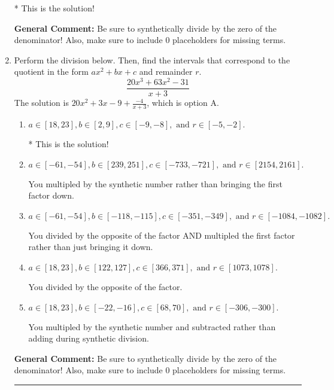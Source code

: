 \documentclass{extbook}[14pt]
\newcommand{\litem}[1]{\item #1

\rule{\textwidth}{0.4pt}}
\begin{document}
\begin{enumerate}
{\begin{enumerate}[label=\Alph*.]
* This is the solution!
\end{enumerate}

\textbf{General Comment:} Be sure to synthetically divide by the zero of the denominator! Also, make sure to include 0 placeholders for missing terms.
}
\litem{
Perform the division below. Then, find the intervals that correspond to the quotient in the form $ax^2+bx+c$ and remainder $r$.
\[ \frac{20x^{3} +63 x^{2} -31}{x + 3} \]The solution is \( 20x^{2} +3 x -9 + \frac{-4}{x + 3} \), which is option A.\begin{enumerate}[label=\Alph*.]
\item \( a \in [18, 23], b \in [2, 9], c \in [-9, -8], \text{ and } r \in [-5, -2]. \)

* This is the solution!
\item \( a \in [-61, -54], b \in [239, 251], c \in [-733, -721], \text{ and } r \in [2154, 2161]. \)

 You multipled by the synthetic number rather than bringing the first factor down.
\item \( a \in [-61, -54], b \in [-118, -115], c \in [-351, -349], \text{ and } r \in [-1084, -1082]. \)

 You divided by the opposite of the factor AND multipled the first factor rather than just bringing it down.
\item \( a \in [18, 23], b \in [122, 127], c \in [366, 371], \text{ and } r \in [1073, 1078]. \)

 You divided by the opposite of the factor.
\item \( a \in [18, 23], b \in [-22, -16], c \in [68, 70], \text{ and } r \in [-306, -300]. \)

 You multipled by the synthetic number and subtracted rather than adding during synthetic division.
\end{enumerate}

\textbf{General Comment:} Be sure to synthetically divide by the zero of the denominator! Also, make sure to include 0 placeholders for missing terms.
}
\end{enumerate}
\end{document}
